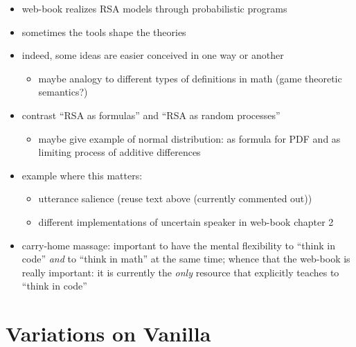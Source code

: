 \documentclass{sp}
\begin{document}
\begin{itemize}
  \item web-book realizes RSA models through probabilistic programs
  \item sometimes the tools shape the theories
  \item indeed, some ideas are easier conceived in one way or another
        \begin{itemize}
          \item maybe analogy to different types of definitions in math (game theoretic semantics?)
        \end{itemize}
  \item contrast ``RSA as formulas'' and ``RSA as random processes''
        \begin{itemize}
          \item maybe give example of normal distribution: as formula for PDF and as limiting process of additive differences
        \end{itemize}
  \item example where this matters:
        \begin{itemize}
          \item utterance salience (reuse text above (currently commented out))
          \item different implementations of uncertain speaker in web-book chapter 2
        \end{itemize}
  \item carry-home massage: important to have the mental flexibility to ``think in code'' \emph{and} to ``think in math'' at the same time; whence that the web-book is really important: it is currently the \emph{only} resource that explicitly teaches to ``think in code''
\end{itemize}

\section{Variations on Vanilla} \label{variations}
\end{document}
